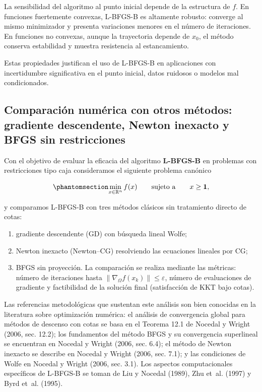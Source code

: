 \documentclass[
  spanish,
  us-letterpaper,
]{scrreprt}
\providecommand{\tightlist}{%
  \setlength{\itemsep}{0pt}\setlength{\parskip}{0pt}}
\numberwithin{equation}{section}
\begin{document}
La sensibilidad del algoritmo al punto inicial depende de la estructura
de \(f\). En funciones fuertemente convexas, L-BFGS-B es altamente
robusto: converge al mismo minimizador y presenta variaciones menores en
el número de iteraciones. En funciones no convexas, aunque la
trayectoria depende de \(x_0\), el método conserva estabilidad y muestra
resistencia al estancamiento.

Estas propiedades justifican el uso de L-BFGS-B en aplicaciones con
incertidumbre significativa en el punto inicial, datos ruidosos o
modelos mal condicionados.

\subsection{Comparación numérica con otros métodos: gradiente
descendente, Newton inexacto y BFGS sin
restricciones}\label{sec-comparacion}

Con el objetivo de evaluar la eficacia del algoritmo \textbf{L-BFGS-B}
en problemas con restricciones tipo caja consideramos el siguiente
problema canónico

\begin{equation}\phantomsection\label{eq-110}{
\min_{x\in\mathbb{R}^n} f(x)\qquad\text{sujeto a}\qquad x \ge \mathbf{1},
}\end{equation}

y comparamos L-BFGS-B con tres métodos clásicos sin tratamiento directo
de cotas:

\begin{enumerate}
\def\labelenumi{(\roman{enumi})}
\tightlist
\item
  gradiente descendente (GD) con búsqueda lineal Wolfe;
\item
  Newton inexacto (Newton--CG) resolviendo las ecuaciones lineales por
  CG;
\item
  BFGS sin proyección. La comparación se realiza mediante las métricas:
  número de iteraciones hasta
  \(\|\nabla_\Omega f(x_k)\|\le\varepsilon\), número de evaluaciones de
  gradiente y factibilidad de la solución final (satisfacción de KKT
  bajo cotas).
\end{enumerate}

Las referencias metodológicas que sustentan este análisis son bien
conocidas en la literatura sobre optimización numérica: el análisis de
convergencia global para métodos de descenso con cotas se basa en el
Teorema 12.1 de Nocedal y Wright (2006, sec. 12.2); los fundamentos del
método BFGS y su convergencia superlineal se encuentran en Nocedal y
Wright (2006, sec. 6.4); el método de Newton inexacto se describe en
Nocedal y Wright (2006, sec. 7.1); y las condiciones de Wolfe en Nocedal
y Wright (2006, sec. 3.1). Los aspectos computacionales específicos de
L-BFGS-B se toman de Liu y Nocedal (1989), Zhu et~al. (1997) y Byrd
et~al. (1995).
\end{document}
